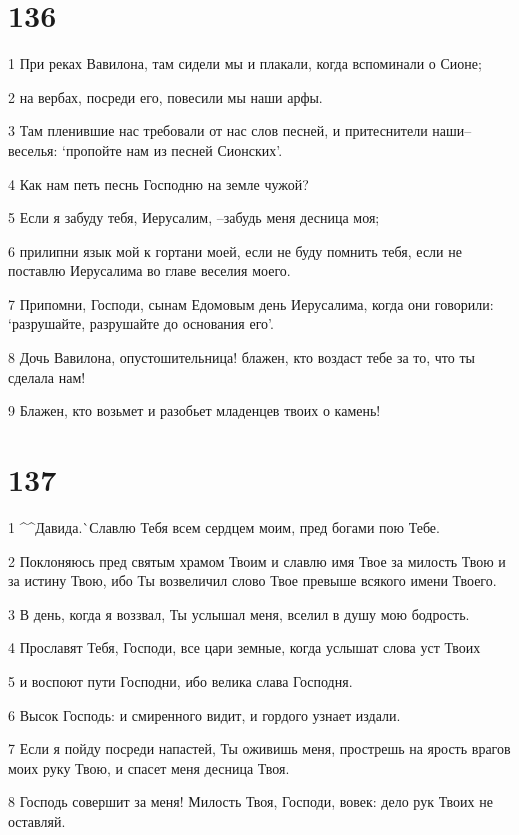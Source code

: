 \chapter{136}

\par 1 При реках Вавилона, там сидели мы и плакали, когда вспоминали о Сионе;
\par 2 на вербах, посреди его, повесили мы наши арфы.
\par 3 Там пленившие нас требовали от нас слов песней, и притеснители наши--веселья: `пропойте нам из песней Сионских'.
\par 4 Как нам петь песнь Господню на земле чужой?
\par 5 Если я забуду тебя, Иерусалим, --забудь меня десница моя;
\par 6 прилипни язык мой к гортани моей, если не буду помнить тебя, если не поставлю Иерусалима во главе веселия моего.
\par 7 Припомни, Господи, сынам Едомовым день Иерусалима, когда они говорили: `разрушайте, разрушайте до основания его'.
\par 8 Дочь Вавилона, опустошительница! блажен, кто воздаст тебе за то, что ты сделала нам!
\par 9 Блажен, кто возьмет и разобьет младенцев твоих о камень!

\chapter{137}

\par 1 ^^Давида.^^ Славлю Тебя всем сердцем моим, пред богами пою Тебе.
\par 2 Поклоняюсь пред святым храмом Твоим и славлю имя Твое за милость Твою и за истину Твою, ибо Ты возвеличил слово Твое превыше всякого имени Твоего.
\par 3 В день, когда я воззвал, Ты услышал меня, вселил в душу мою бодрость.
\par 4 Прославят Тебя, Господи, все цари земные, когда услышат слова уст Твоих
\par 5 и воспоют пути Господни, ибо велика слава Господня.
\par 6 Высок Господь: и смиренного видит, и гордого узнает издали.
\par 7 Если я пойду посреди напастей, Ты оживишь меня, прострешь на ярость врагов моих руку Твою, и спасет меня десница Твоя.
\par 8 Господь совершит за меня! Милость Твоя, Господи, вовек: дело рук Твоих не оставляй.

